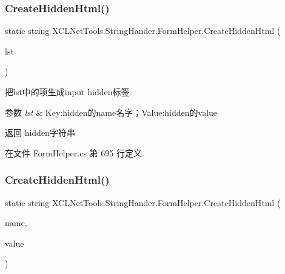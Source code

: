 \subsubsection{\texorpdfstring{Create\+Hidden\+Html()}{CreateHiddenHtml()}\hspace{0.1cm}{\footnotesize\ttfamily [1/2]}}
{\footnotesize\ttfamily static string X\+C\+L\+Net\+Tools.\+String\+Hander.\+Form\+Helper.\+Create\+Hidden\+Html (\begin{DoxyParamCaption}\item[{List$<$ \hyperlink{class_x_c_l_net_tools_1_1_entity_1_1_text_value}{X\+C\+L\+Net\+Tools.\+Entity.\+Text\+Value} $>$}]{lst }\end{DoxyParamCaption})\hspace{0.3cm}{\ttfamily [static]}}



把lst中的项生成input hidden标签 


\begin{DoxyParams}{参数}
{\em lst} & Key\+:hidden的name名字；\+Value\+:hidden的value\\
\hline
\end{DoxyParams}
\begin{DoxyReturn}{返回}
hidden字符串
\end{DoxyReturn}


在文件 Form\+Helper.\+cs 第 695 行定义.

\mbox{\label{class_x_c_l_net_tools_1_1_string_hander_1_1_form_helper_a3df398dd109cfe76da34602149d16410}} 
\subsubsection{\texorpdfstring{Create\+Hidden\+Html()}{CreateHiddenHtml()}\hspace{0.1cm}{\footnotesize\ttfamily [2/2]}}
{\footnotesize\ttfamily static string X\+C\+L\+Net\+Tools.\+String\+Hander.\+Form\+Helper.\+Create\+Hidden\+Html (\begin{DoxyParamCaption}\item[{string}]{name,  }\item[{string}]{value }\end{DoxyParamCaption})\hspace{0.3cm}{\ttfamily [static]}}



